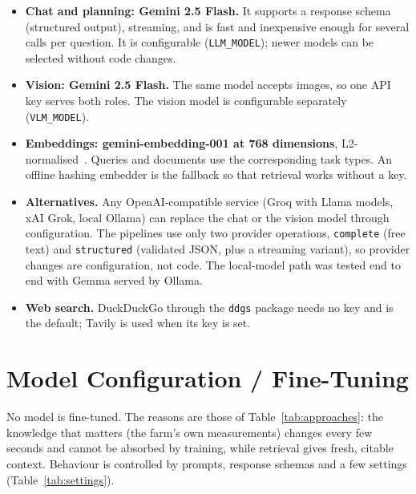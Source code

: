 \begin{itemize}
\item \textbf{Chat and planning: Gemini 2.5 Flash.} It supports a response schema (structured output), streaming, and is fast and
      inexpensive enough for several calls per question. It is configurable (\texttt{LLM\_MODEL}); newer models can be
      selected without code changes.
\item \textbf{Vision: Gemini 2.5 Flash.} The same model accepts images, so one API key serves both roles. The vision model is configurable
      separately (\texttt{VLM\_MODEL}).
\item \textbf{Embeddings: gemini-embedding-001 at 768 dimensions}, L2-normalised~\cite{lee2025geminiembedding}. Queries and documents
      use the corresponding task types. An offline hashing embedder is the fallback so that retrieval works without a key.
\item \textbf{Alternatives.} Any OpenAI-compatible service (Groq with Llama models, xAI Grok, local Ollama) can replace the chat or the vision
      model through configuration. The pipelines use only two provider operations, \texttt{complete} (free text) and \texttt{structured}
      (validated JSON, plus a streaming variant), so provider changes are configuration, not code. The local-model path was
      tested end to end with Gemma served by Ollama.
\item \textbf{Web search.} DuckDuckGo through the \texttt{ddgs} package needs no key and is the default; Tavily is used when its key is set.
\end{itemize}

\section{Model Configuration / Fine-Tuning}

No model is fine-tuned. The reasons are those of Table~\ref{tab:approaches}: the knowledge that matters (the farm's own
measurements) changes every few seconds and cannot be absorbed by training, while retrieval gives fresh, citable context. Behaviour is
controlled by prompts, response schemas and a few settings (Table~\ref{tab:settings}).

